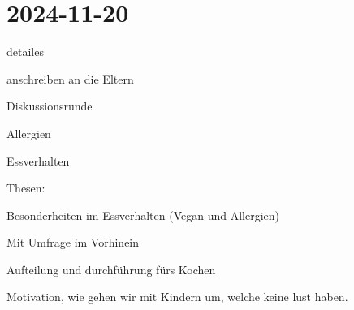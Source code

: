 \section{2024-11-20}

\startitemize[packed]
\item detailes
\item anschreiben an die Eltern
\item Diskussionsrunde
\item Allergien
\item Essverhalten
\item Thesen:
\startitemize[packed,m]
\item Besonderheiten im Essverhalten (Vegan und Allergien)
\startitemize[packed]
\item Mit Umfrage im Vorhinein
\stopitemize
\item Aufteilung und durchführung fürs Kochen
\item Motivation, wie gehen wir mit Kindern um, welche keine lust haben.
\stopitemize
\stopitemize

